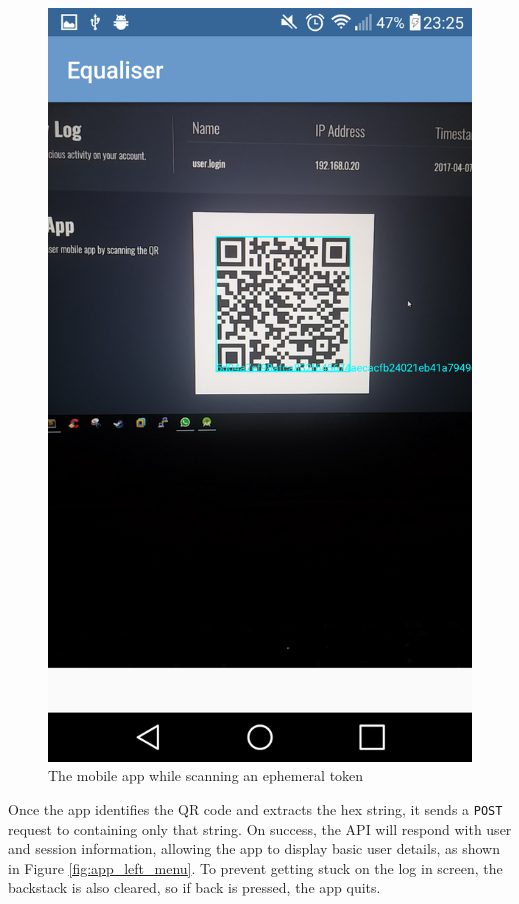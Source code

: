 \documentclass[12pt,a4paper]{bhamdissertation}
\newcommand{\code}[1]{\texttt{#1}}
\begin{document}
\begin{figure}[!htbp]
\begin{minipage}[b]{0.4\textwidth}
    \includegraphics[width=\textwidth]{img/app_qr_scan.png}
    \caption{The mobile app while scanning an ephemeral token}
    \label{fig:app_qr_scan}
  \end{minipage}
  \hspace{0.05\textwidth}
\end{figure}

Once the app identifies the QR code and extracts the hex string, it sends a \code{POST} request to \code{} containing only that string. On success, the API will respond with user and session information, allowing the app to display basic user details, as shown in Figure \ref{fig:app_left_menu}. To prevent getting stuck on the log in screen, the backstack is also cleared, so if back is pressed, the app quits.
\end{document}
